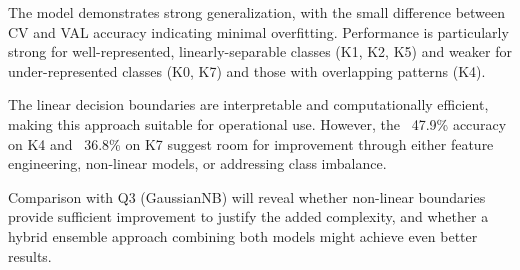 \documentclass[12pt]{article}
\begin{document}
The model demonstrates strong generalization, with the small difference between CV and VAL accuracy indicating minimal overfitting. Performance is particularly strong for well-represented, linearly-separable classes (K1, K2, K5) and weaker for under-represented classes (K0, K7) and those with overlapping patterns (K4).

The linear decision boundaries are interpretable and computationally efficient, making this approach suitable for operational use. However, the ~47.9\% accuracy on K4 and ~36.8\% on K7 suggest room for improvement through either feature engineering, non-linear models, or addressing class imbalance.

Comparison with Q3 (GaussianNB) will reveal whether non-linear boundaries provide sufficient improvement to justify the added complexity, and whether a hybrid ensemble approach combining both models might achieve even better results.
\end{document}
